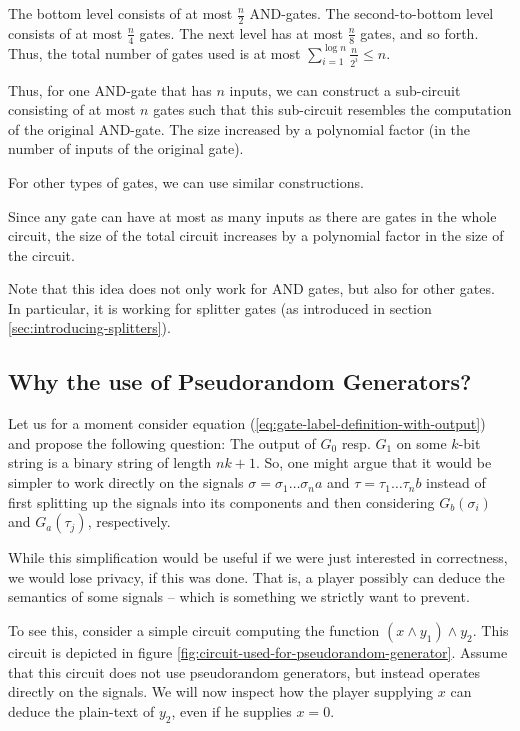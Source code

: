 The bottom level consists of at most $\frac{n}{2}$ AND-gates. The second-to-bottom level consists of at most $\frac{n}{4}$ gates. The next level has at most $\frac{n}{8}$ gates, and so forth. Thus, the total number of gates used is at most $\sum_{i=1}^{\log n} \frac{n}{2^i}\leq n$.

Thus, for one AND-gate that has $n$ inputs, we can construct a sub-circuit consisting of at most $n$ gates such that this sub-circuit resembles the computation of the original AND-gate. The size increased by a polynomial factor (in the number of inputs of the original gate). 

For other types of gates, we can use similar constructions.

Since any gate can have at most as many inputs as there are gates in the whole circuit, the size of the total circuit increases by a polynomial factor in the size of the circuit.

Note that this idea does not only work for AND gates, but also for other gates. In particular, it is working for splitter gates (as introduced in section \ref{sec:introducing-splitters}).

\subsection{Why the use of Pseudorandom Generators?}
\label{sec:appendix-why-pseudorandom-generators}

Let us for a moment consider equation (\ref{eq:gate-label-definition-with-output}) and propose the following question: The output of $G_0$ resp. $G_1$ on some $k$-bit string is a binary string of length $nk+1$. So, one might argue that it would be simpler to work directly on the signals $\sigma=\sigma_1\dots\sigma_n a$ and $\tau=\tau_1\dots\tau_n b$ instead of first splitting up the signals into its components and then considering $G_b(\sigma_i)$ and $G_a(\tau_j)$, respectively.

While this simplification would be useful if we were just interested in correctness, we would lose privacy, if this was done. That is, a player possibly can deduce the semantics of some signals -- which is something we strictly want to prevent.

To see this, consider a simple circuit computing the function $(x\wedge y_1) \wedge y_2$. This circuit is depicted in figure \ref{fig:circuit-used-for-pseudorandom-generator}. Assume that this circuit does not use pseudorandom generators, but instead operates directly on the signals. We will now inspect how the player supplying $x$ can deduce the plain-text of $y_2$, even if he supplies $x=0$.


